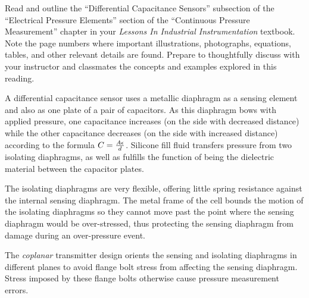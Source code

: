

Read and outline the ``Differential Capacitance Sensors'' subsection of the ``Electrical Pressure Elements'' section of the ``Continuous Pressure Measurement'' chapter in your {\it Lessons In Industrial Instrumentation} textbook.  Note the page numbers where important illustrations, photographs, equations, tables, and other relevant details are found.  Prepare to thoughtfully discuss with your instructor and classmates the concepts and examples explored in this reading.














A differential capacitance sensor uses a metallic diaphragm as a sensing element and also as one plate of a pair of capacitors.  As this diaphragm bows with applied pressure, one capacitance increases (on the side with decreased distance) while the other capacitance decreases (on the side with increased distance) according to the formula $C = {A \epsilon \over d}$.  Silicone fill fluid transfers pressure from two isolating diaphragms, as well as fulfills the function of being the dielectric material between the capacitor plates.

\vskip 10pt

The isolating diaphragms are very flexible, offering little spring resistance against the internal sensing diaphragm.  The metal frame of the cell bounds the motion of the isolating diaphragms so they cannot move past the point where the sensing diaphragm would be over-stressed, thus protecting the sensing diaphragm from damage during an over-pressure event.

\vskip 10pt

The {\it coplanar} transmitter design orients the sensing and isolating diaphragms in different planes to avoid flange bolt stress from affecting the sensing diaphragm.  Stress imposed by these flange bolts otherwise cause pressure measurement errors.

















